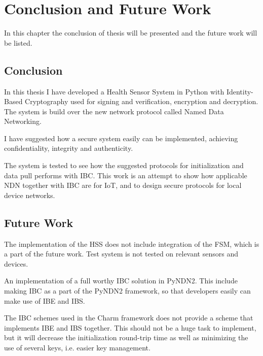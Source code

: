 \chapter{Conclusion and Future Work}\label{chp7:conclusion}
In this chapter the conclusion of thesis will be presented and the future work will be listed.

\section{Conclusion}
In this thesis I have developed a Health Sensor System in Python with Identity-Based Cryptography used for signing and verification, encryption and decryption.
The system is build over the new network protocol called Named Data Networking.

I have suggested how a secure system easily can be implemented, achieving confidentiality, integrity and authenticity.

The system is tested to see how the suggested protocols for initialization and data pull performs with \gls{IBC}. 
This work is an attempt to show how applicable \gls{NDN} together with \gls{IBC} are for \gls{IoT}, and to design secure protocols for local device networks.

\section{Future Work}
The implementation of the \gls{HSS} does not include integration of the \gls{FSM}, which is a part of the future work.
Test system is not tested on relevant sensors and devices.

An implementation of a full worthy \gls{IBC} solution in \gls{PyNDN2}.
This include making \gls{IBC} as a part of the PyNDN2 framework, so that developers easily can make use of \gls{IBE} and \gls{IBS}.

The \gls{IBC} schemes used in the Charm framework does not provide a scheme that implements \gls{IBE} and \gls{IBS} together.
This should not be a huge task to implement, but it will decrease the initialization round-trip time as well as minimizing the use of several keys, i.e. easier key management. 
